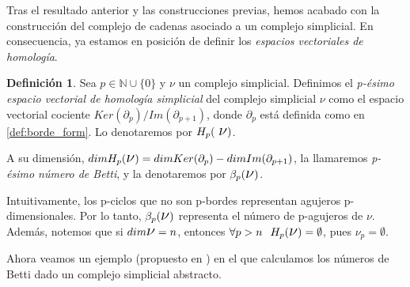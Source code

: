\documentclass[12pt, a4paper, twoside]{book}
\numberwithin{equation}{section}
\theoremstyle{definition}
\newtheorem{defi}{Definición}[section]
\theoremstyle{remark}
\theoremstyle{plain}
\begin{document}
	Tras el resultado anterior y las construcciones previas, hemos acabado
	con la construcción del complejo de cadenas asociado a un complejo 
	simplicial. En consecuencia, ya estamos en posición de definir los
	\emph{espacios vectoriales de homología}.

	\begin{defi}
		\label{defi:homology}
		Sea $p \in \mathbb{N}\cup\{0\}$ y {\Large $\nu$} un complejo 
		simplicial. Definimos el \textit{p-ésimo espacio vectorial de 
		homología simplicial} del complejo simplicial {\Large $\nu$} 
		como el espacio vectorial cociente $Ker(\partial_{p})/
		Im(\partial_{p+1})$, donde $\partial_{p}$ está definida como
		en \ref{def:borde_form}. Lo denotaremos por $H_{p}(\text{
		{\Large $\nu$}})$.

		A su dimensión, $dimH_{p}(\text{{\Large $\nu$}})=
		dimKer(\partial_{p})-dimIm(\partial_{p+1})$, la 
		llamaremos \textit{p-ésimo número de Betti}, y la denotaremos
		por $\beta_{p}(\text{{\Large $\nu$}})$.
	\end{defi}

	Intuitivamente, los p-ciclos que no son p-bordes representan agujeros
	p-dimensionales. Por lo tanto, $\beta_{p}(\text{{\Large $\nu$}})$ 
	representa el número de p-agujeros de {\Large $\nu$}. Además, notemos 
	que si $dim\text{{\Large $\nu$}}=n$, entonces $\forall p >n 
	\hspace{0.25cm} H_{p}(\text{{\Large $\nu$}})=\emptyset$, pues {\Large 
	$\nu$}$_{p}=\emptyset$.

	Ahora veamos un ejemplo (propuesto en \cite{Intro-Otter}) en el que calculamos 
	los números de Betti dado un complejo simplicial abstracto.
\end{document}
